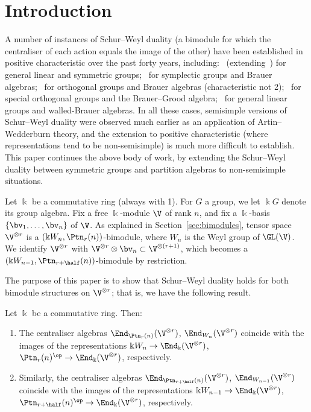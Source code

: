 
\section*{Introduction}%
A number of instances of Schur--Weyl duality (a bimodule for which the
centraliser of each action equals the image of the other) have been
established in positive characteristic over the past forty years,
including:~\cite{Benson-Doty} (extending~\cite{Carter-Lusztig, dCP,
 Green:book}) for general linear and symmetric groups;~\cite{DDH} for
symplectic groups and Brauer algebras;~\cite{DH} for orthogonal groups
and Brauer algebras (characteristic not 2);~\cite{Garge-Nebhani} for
special orthogonal groups and the Brauer--Grood algebra;~\cite{DDS1,
 DDS2, DD, Donkin} for general linear groups and walled-Brauer
algebras. In all these cases, semisimple versions of Schur--Weyl
duality were observed much earlier as an application of
Artin--Wedderburn theory, and the extension to positive characteristic
(where representations tend to be non-semisimple) is much more
difficult to establish. This paper continues the above body of work, by
extending the Schur--Weyl duality between symmetric groups and
partition algebras to non-semisimple situations.

Let $\Bbbk$ be a commutative ring (always with 1). 
For $G$ a group, we let $\Bbbk G$ denote its group algebra. 
Fix a free
$\Bbbk$-module $\V$ of rank $n$, and fix a $\Bbbk$-basis $\{\bv_1,
\dots, \bv_n\}$ of $\V$. As explained in Section~\ref{sec:bimodules},
tensor space $\V^{\otimes r}$ is a $(\Bbbk W_n, \Ptn_r(n))$-bimodule,
where $W_n$ is the Weyl group of $\GL(\V)$. We identify $\V^{\otimes
 r}$ with $\V^{\otimes r} \otimes \bv_n \subset \V^{\otimes (r+1)}$,
which becomes a $(\Bbbk W_{n-1}, \Ptn_{r+\half}(n))$-bimodule by
restriction.

The purpose of this paper is to show that Schur--Weyl duality holds
for both bimodule structures on $\V^{\otimes r}$; that is, we have
the following result.


\begin{theo*}
 Let $\Bbbk$ be a commutative ring. Then:
 \begin{enumerate}[label=(\alph*)]
 \item\label{theo*_a} The centraliser algebras $\End_{\Ptn_r(n)}(\V^{\otimes r})$,
 $\End_{W_n}(\V^{\otimes r})$ coincide with the images of the
 representations $\Bbbk W_n \to \End_\Bbbk(\V^{\otimes r})$,
 $\Ptn_r(n)^{\op} \to \End_\Bbbk(\V^{\otimes r})$, respectively.
 
 \item\label{theo*_b}  Similarly, the centraliser algebras
 $\End_{\Ptn_{r+\half}(n)}(\V^{\otimes r})$,
 $\End_{W_{n-1}}(\V^{\otimes r})$ coincide with the images of the
 representations $\Bbbk W_{n-1} \to \End_\Bbbk(\V^{\otimes r})$,
 $\Ptn_{r+\half}(n)^{\op} \to \End_\Bbbk(\V^{\otimes r})$,
 respectively.
 \end{enumerate}
\end{theo*}

